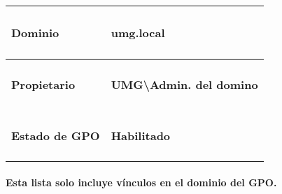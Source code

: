 \documentclass[
]{article}
\begin{document}
\begin{longtable}[]{@{}ll@{}}
\toprule
\begin{minipage}[b]{0.47\columnwidth}\raggedright
\hypertarget{dominio}{%
\paragraph{Dominio}\label{dominio}}\strut
\end{minipage} & \begin{minipage}[b]{0.47\columnwidth}\raggedright
\hypertarget{umg.local}{%
\paragraph{umg.local}\label{umg.local}}\strut
\end{minipage}\tabularnewline
\midrule
\endhead
\begin{minipage}[t]{0.47\columnwidth}\raggedright
\hypertarget{propietario}{%
\paragraph{Propietario}\label{propietario}}\strut
\end{minipage} & \begin{minipage}[t]{0.47\columnwidth}\raggedright
\hypertarget{umgadmin.-del-domino}{%
\paragraph{UMG\textbackslash Admin. del
domino}\label{umgadmin.-del-domino}}\strut
\end{minipage}\tabularnewline
\begin{minipage}[t]{0.47\columnwidth}\raggedright
\hypertarget{estado-de-gpo}{%
\paragraph{Estado de GPO}\label{estado-de-gpo}}\strut
\end{minipage} & \begin{minipage}[t]{0.47\columnwidth}\raggedright
\hypertarget{habilitado}{%
\paragraph{Habilitado}\label{habilitado}}\strut
\end{minipage}\tabularnewline
\bottomrule
\end{longtable}

\hypertarget{esta-lista-solo-incluye-vuxednculos-en-el-dominio-del-gpo.}{%
\paragraph{Esta lista solo incluye vínculos en el dominio del
GPO.}\label{esta-lista-solo-incluye-vuxednculos-en-el-dominio-del-gpo.}}
\end{document}
